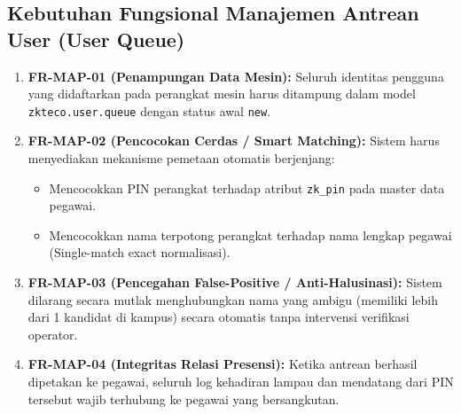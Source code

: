 \documentclass[12pt,a4paper]{article}
\begin{document}
\subsection{Kebutuhan Fungsional Manajemen Antrean User (User Queue)}
\begin{enumerate}
    \item \textbf{FR-MAP-01 (Penampungan Data Mesin):} Seluruh identitas pengguna yang didaftarkan pada perangkat mesin harus ditampung dalam model \texttt{zkteco.user.queue} dengan status awal \texttt{new}.
    \item \textbf{FR-MAP-02 (Pencocokan Cerdas / Smart Matching):} Sistem harus menyediakan mekanisme pemetaan otomatis berjenjang:
    \begin{itemize}
        \item Mencocokkan PIN perangkat terhadap atribut \texttt{zk\_pin} pada master data pegawai.
        \item Mencocokkan nama terpotong perangkat terhadap nama lengkap pegawai (Single-match exact normalisasi).
    \end{itemize}
    \item \textbf{FR-MAP-03 (Pencegahan False-Positive / Anti-Halusinasi):} Sistem dilarang secara mutlak menghubungkan nama yang ambigu (memiliki lebih dari 1 kandidat di kampus) secara otomatis tanpa intervensi verifikasi operator.
    \item \textbf{FR-MAP-04 (Integritas Relasi Presensi):} Ketika antrean berhasil dipetakan ke pegawai, seluruh log kehadiran lampau dan mendatang dari PIN tersebut wajib terhubung ke pegawai yang bersangkutan.
\end{enumerate}
\end{document}
